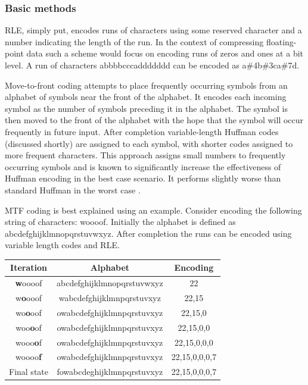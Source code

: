 \subsubsection{Basic methods}
RLE, simply put, encodes runs of characters using some reserved character and a number indicating the length of the run. In the context of compressing floating-point data such a scheme would 
focus on encoding runs of zeros and ones at a bit level. A run of characters abbbbcccaddddddd can be encoded as a\#4b\#3ca\#7d.

Move-to-front coding attempts to place frequently occurring symbols from an alphabet of symbols near the front of the alphabet. It encodes each incoming symbol as the number of 
symbols preceding it in the alphabet. The symbol is then moved to the front of the alphabet with the hope that the symbol will occur frequently in future input. After completion 
variable-length Huffman codes (discussed shortly) are assigned to each symbol, with shorter codes assigned to more frequent characters. This approach assigns small numbers to
frequently occurring symbols and is known to significantly increase the effectiveness of Huffman encoding in the best case scenario. It performs slightly worse than standard 
Huffman in the worst case \cite[ch. 1]{salomon2004data}.

MTF coding is best explained using an example. Consider encoding the following string of characters: woooof. Initially the alphabet is defined as abcdefghijklmnopqrstuvwxyz. 
After completion the runs can be encoded using variable length codes and RLE.

\begin{center} 
 \begin{tabular}{|c|c|c|}
 \hline 
 Iteration & Alphabet & Encoding \\
 \hline 
 \textbf{w}oooof & abcdefghijklmnopqrstuvwxyz & 22\\
 \hline 
 w\textbf{o}ooof & wabcdefghijklmnpqrstuvxyz & 22,15\\
 \hline 
 wo\textbf{o}oof & owabcdefghijklmnpqrstuvxyz & 22,15,0\\
 \hline 
 woo\textbf{o}of & owabcdefghijklmnpqrstuvxyz & 22,15,0,0\\
 \hline 
 wooo\textbf{o}f & owabcdefghijklmnpqrstuvxyz & 22,15,0,0,0\\
 \hline 
 woooo\textbf{f} & owabcdefghijklmnpqrstuvxyz & 22,15,0,0,0,7\\
 \hline 
 Final state & fowabcdeghijklmnpqrstuvxyz & 22,15,0,0,0,7\\
 \hline
 \end{tabular}
\end{center}

